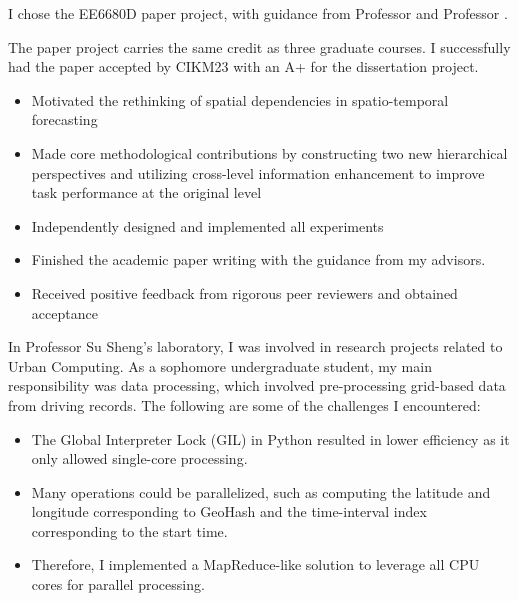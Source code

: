 \documentclass{resume}
\begin{document}
I chose the EE6680D paper project, with guidance from Professor \href{(https://www.cityu.edu.hk/stfprofile/haoliali.htm)}{\color{blue}{Haoliang Li}} and Professor \href{(https://www.cityu.edu.hk/stfprofile/xyzhao.htm)}{\color{blue}{Xiangyu Zhao}}.

The paper project carries the same credit as three graduate courses. I successfully had the paper accepted by CIKM23 with an A+ for the dissertation project.

\begin{itemize}
\item Motivated the rethinking of spatial dependencies in spatio-temporal forecasting
\item Made core methodological contributions by constructing two new hierarchical perspectives and utilizing cross-level information enhancement to improve task performance at the original level
\item Independently designed and implemented all experiments
\item Finished the academic paper writing with the guidance from my advisors. 
\item Received positive feedback from rigorous peer reviewers and obtained acceptance
\end{itemize}

In Professor Su Sheng's laboratory, I was involved in research projects related to Urban Computing.
As a sophomore undergraduate student, my main responsibility was data processing, which involved pre-processing grid-based data from driving records.
The following are some of the challenges I encountered:
\begin{itemize}
\item The Global Interpreter Lock (GIL) in Python resulted in lower efficiency as it only allowed single-core processing.
\item Many operations could be parallelized, such as computing the latitude and longitude corresponding to GeoHash and the time-interval index corresponding to the start time.
\item Therefore, I implemented a MapReduce-like solution to leverage all CPU cores for parallel processing.
\end{itemize}
\end{document}
